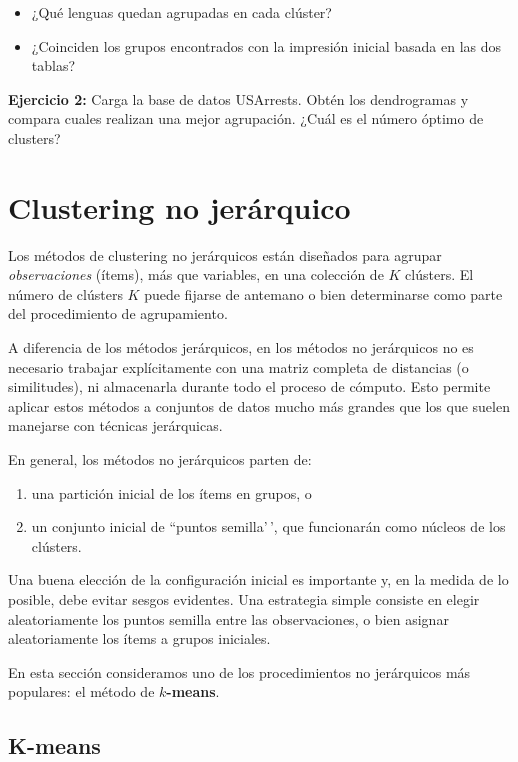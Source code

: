 \documentclass[
]{book}
\begin{document}
\begin{itemize}
\item
  ¿Qué lenguas quedan agrupadas en cada clúster?
\item
  ¿Coinciden los grupos encontrados con la impresión inicial basada en las dos tablas?
\end{itemize}

\textbf{Ejercicio 2:} Carga la base de datos USArrests. Obtén los dendrogramas y compara cuales realizan una mejor agrupación. ¿Cuál es el número óptimo de clusters?

\section{Clustering no jerárquico}\label{clustering-no-jeruxe1rquico}

Los métodos de clustering no jerárquicos están diseñados para agrupar \emph{observaciones} (ítems), más que variables, en una colección de \(K\) clústers. El número de clústers \(K\) puede fijarse de antemano o bien determinarse como parte del procedimiento de agrupamiento.

A diferencia de los métodos jerárquicos, en los métodos no jerárquicos no es necesario trabajar explícitamente con una matriz completa de distancias (o similitudes), ni almacenarla durante todo el proceso de cómputo. Esto permite aplicar estos métodos a conjuntos de datos mucho más grandes que los que suelen manejarse con técnicas jerárquicas.

En general, los métodos no jerárquicos parten de:

\begin{enumerate}
\def\labelenumi{\arabic{enumi})}
\item
  una partición inicial de los ítems en grupos, o
\item
  un conjunto inicial de ``puntos semilla'\,', que funcionarán como núcleos de los clústers.
\end{enumerate}

Una buena elección de la configuración inicial es importante y, en la medida de lo posible, debe evitar sesgos evidentes. Una estrategia simple consiste en elegir aleatoriamente los puntos semilla entre las observaciones, o bien asignar aleatoriamente los ítems a grupos iniciales.

En esta sección consideramos uno de los procedimientos no jerárquicos más populares: el método de \textbf{\(k\)-means}.

\subsection{K-means}\label{k-means}
\end{document}

